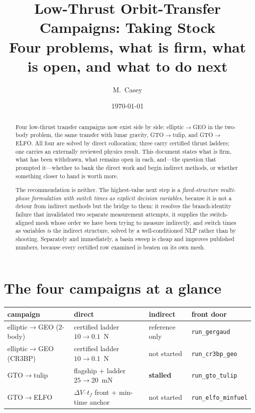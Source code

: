 \documentclass[11pt]{article}
\title{Low-Thrust Orbit-Transfer Campaigns: Taking Stock\\
       \large Four problems, what is firm, what is open, and what to do next}
\author{M.\ Casey}
\date{\today}
\newcommand{\dV}{\Delta V}
\newcommand{\camp}[1]{\texttt{#1}}
\begin{document}
\maketitle

\begin{abstract}
Four low-thrust transfer campaigns now exist side by side: elliptic$\to$GEO in
the two-body problem, the same transfer with lunar gravity, GTO$\to$tulip, and
GTO$\to$ELFO. All four are solved by direct collocation; three carry certified
thrust ladders; one carries an externally reviewed physics result. This
document states what is firm, what has been withdrawn, what remains open in
each, and---the question that prompted it---whether to bank the direct work and
begin indirect methods, or whether something closer to hand is worth more.

The recommendation is neither. The highest-value next step is a
\emph{fixed-structure multi-phase formulation with switch times as explicit
decision variables}, because it is not a detour from indirect methods but the
bridge to them: it resolves the branch-identity failure that invalidated two
separate measurement attempts, it supplies the switch-aligned mesh whose order
we have been trying to measure indirectly, and switch times as variables
\emph{is} the indirect structure, solved by a well-conditioned NLP rather than
by shooting. Separately and immediately, a basin sweep is cheap and improves
published numbers, because every certified row examined is beaten on its own
mesh.
\end{abstract}

\tableofcontents

\section{The four campaigns at a glance}

\begin{table}[h]
\centering\small
\begin{tabular}{llll}
\toprule
campaign & direct & indirect & front door \\
\midrule
elliptic$\to$GEO (2-body) & certified ladder $10\to0.1$~N & reference only & \camp{run\_gergaud} \\
elliptic$\to$GEO (CR3BP)  & certified ladder $10\to0.1$~N & not started & \camp{run\_cr3bp\_geo} \\
GTO$\to$tulip             & flagship + ladder $25\to20$~mN & \textbf{stalled} & \camp{run\_gto\_tulip} \\
GTO$\to$ELFO              & $\dV$--$t_f$ front + min-time anchor & not started & \camp{run\_elfo\_minfuel} \\
\bottomrule
\end{tabular}
\end{table}
\end{document}
